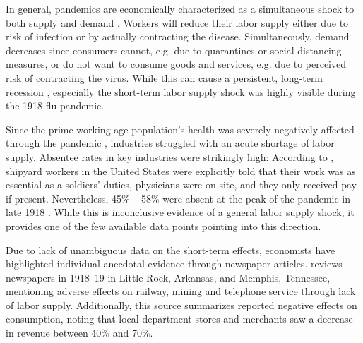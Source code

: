 \documentclass[12pt,a4paper]{article}
\begin{document}
In general, pandemics are economically characterized as a simultaneous shock to both supply and demand \citep{eichenbaumMacroeconomicsEpidemics2020}.
Workers will reduce their labor supply either due to risk of infection or by actually contracting the disease.
Simultaneously, demand decreases since consumers cannot, e.g. due to quarantines or social distancing measures, or do not want to consume goods and services, e.g. due to perceived risk of contracting the virus. While this can cause a persistent, long-term recession \citep{eichenbaumMacroeconomicsEpidemics2020}, especially the short-term labor supply shock was highly visible during the 1918 flu pandemic.

Since the prime working age population's health was severely negatively affected through the pandemic \citep{taubenberger1918InfluenzaMother2006}, industries struggled with an acute shortage of labor supply.
Absentee rates in key industries were strikingly high: According to \cite{barryPandemicsAvoidingMistakes2009}, 
shipyard workers in the United States were explicitly told that their work was as essential as a soldiers' duties, physicians were on-site, and they only received pay if present.
Nevertheless, 45\% -- 58\% were absent at the peak of the pandemic in late 1918 \citep{turnerReportPreventiveMeasure}.
While this is inconclusive evidence of a general labor supply shock, it provides one of the few available data points pointing into this direction.

Due to lack of unambiguous data on the short-term effects, economists have highlighted individual anecdotal evidence through newspaper articles.
\cite{garrettEconomicEffects19182007} reviews newspapers in 1918--19 in Little Rock, Arkansas, and Memphis, Tennessee, mentioning adverse effects on railway, mining and telephone service through lack of labor supply.
Additionally, this source summarizes reported negative effects on consumption, noting that local department stores and merchants saw a decrease in revenue between 40\% and 70\%.
\end{document}
